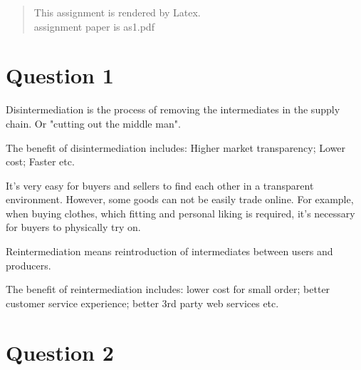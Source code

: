 \documentclass[12pt]{article}
\begin{document}
\maketitle

\begin{abstract}
  This assignment is rendered by Latex.\\
  assignment paper is as1.pdf
\end{abstract}

\clearpage

\section{Question 1}
Disintermediation is the process of removing the intermediates in the supply chain. Or "cutting out the middle man". 

The benefit of disintermediation includes:
Higher market transparency;
Lower cost;
Faster etc.

It's very easy for buyers and sellers to find each other in a transparent environment. However, some goods can not be easily trade online. For example, when buying clothes, which fitting and personal liking is required, it's necessary for buyers to physically try on.

Reintermediation means reintroduction of intermediates between users and producers.

The benefit of reintermediation includes:
lower cost for small order;
better customer service experience;
better 3rd party web services etc.

\section{Question 2}
\end{document}
